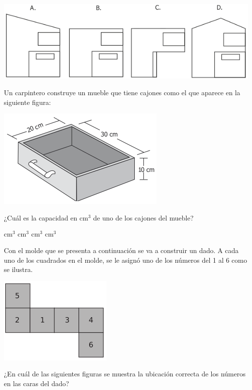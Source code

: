 \documentclass[10pt,letterpaper,addpoints]{exam}
\begin{document}
\begin{multicols}{2}
\begin{questions}
 \begin{center}
 \includegraphics[scale=.45]{Images/Pantallazo-1.png} 
 \end{center}
 \question Un carpintero construye un mueble que tiene cajones como el que aparece en la siguiente figura:
 \begin{center}
 \includegraphics[scale=.6]{Images/Pantallazo-2.png} 
 \end{center}
 ¿Cuál es la capacidad en cm$^{3}$ de uno de los cajones del mueble?
 \begin{choices}
  cm$^{3}$
  cm$^{3}$
  cm$^{3}$
   cm$^{3}$
 \end{choices}
 \question Con el molde que se presenta a continuación se va a construir un dado. A cada uno de los cuadrados en el molde, se le asignó uno de los números del 1 al 6 como se ilustra.
 \begin{center}
 \includegraphics[scale=.6]{Images/Pantallazo-3.png} 
 \end{center}
 ¿En cuál de las siguientes figuras se muestra la ubicación correcta de los números en las caras del dado?
 \begin{center}

\end{center}
\end{questions}
\end{multicols}
\end{document}
